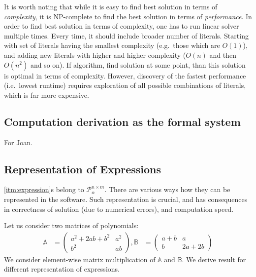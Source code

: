 
It is worth noting that while it is easy to find best solution in
terms of {\em complexity}, it is NP-complete to find the best solution
in terms of {\em performance}. In order to find best solution in terms
of complexity, one has to run linear solver multiple times. Every
time, it should include broader number of literals. Starting with set
of literals having the smallest complexity (e.g.~those which are
$O(1)$), and adding new literals with higher and higher complexity
($O(n)$ and then $O(n^2)$ and so on). If algorithm, find solution at
some point, than this solution is optimal in terms of
complexity. However, discovery of the fastest performance (i.e.~lowest
runtime) requires exploration of all possible combinations of literals,
which is far more expensive.  

\subsection{Computation derivation as the formal system}

For Joan.

\subsection{Representation of Expressions}
\ref{itm:expression}s belong to $\mathcal{P}^{n \times m}_\alpha$. There are various
ways how they can be represented in the software. Such representation is crucial, and has consequences in
correctness of solution (due to numerical errors), and computation speed.

Let us consider two matrices of polynomials:
\begin{align*}
\mathbb{A} &= \begin{pmatrix} a^2 + 2ab + b^2 & a^2\\ b^2 & ab \end{pmatrix}, \mathbb{B} &= \begin{pmatrix} a + b & a\\ b & 2a + 2b \end{pmatrix}
\end{align*}
We consider element-wise matrix multiplication of $\mathbb{A}$ and $\mathbb{B}$. We derive result for different representation of expressions.



